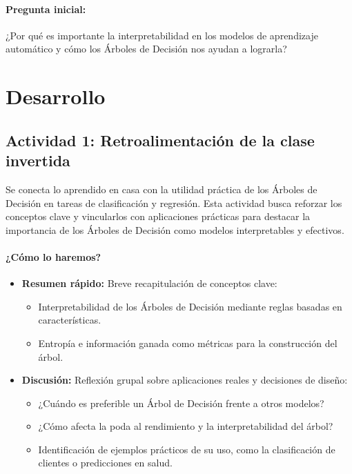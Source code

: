 \documentclass[a4,11pt]{aleph-notas}
\begin{document}
\paragraph{Pregunta inicial:}
¿Por qué es importante la interpretabilidad en los modelos de aprendizaje automático y cómo los Árboles de Decisión nos ayudan a lograrla?

\section*{Desarrollo}

\subsection*{Actividad 1: Retroalimentación de la clase invertida}  

Se conecta lo aprendido en casa con la utilidad práctica de los Árboles de Decisión en tareas de clasificación y regresión. Esta actividad busca reforzar los conceptos clave y vincularlos con aplicaciones prácticas para destacar la importancia de los Árboles de Decisión como modelos interpretables y efectivos.

\paragraph{¿Cómo lo haremos?}  
\begin{itemize}  
    \item \textbf{Resumen rápido:}  
    Breve recapitulación de conceptos clave:
    \begin{itemize}[leftmargin=*]  
        \item Interpretabilidad de los Árboles de Decisión mediante reglas basadas en características.  
        \item Entropía e información ganada como métricas para la construcción del árbol.  
    \end{itemize}  

    \item \textbf{Discusión:}  
    Reflexión grupal sobre aplicaciones reales y decisiones de diseño:  
    \begin{itemize}[leftmargin=*]  
        \item ¿Cuándo es preferible un Árbol de Decisión frente a otros modelos?  
        \item ¿Cómo afecta la poda al rendimiento y la interpretabilidad del árbol?  
        \item Identificación de ejemplos prácticos de su uso, como la clasificación de clientes o predicciones en salud.  
    \end{itemize}  
\end{itemize}  
\end{document}
